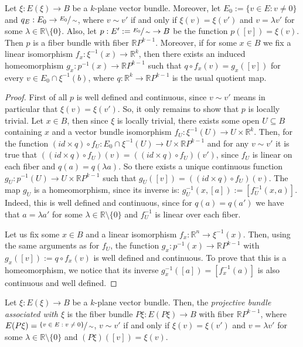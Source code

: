 \begin{proposition}\label{prop:proj_bundle} Let $\xi:E(\xi)\to B$ be a $k$-plane vector bundle. Moreover, let $E_0:=\{v\in E:v\neq 0\}$ and $q_E:E_0\to\sfrac{E_0}{\sim}$, where $v\sim v'$ if and only if $\xi(v)=\xi(v')$ and $v=\lambda v'$ for some $\lambda\in\mathbb{R}\setminus\{0\}$. Also, let $p:E':=\sfrac{E_0}{\sim}\to B$ be the function $p([v])=\xi(v)$. Then $p$ is a fiber bundle with fiber $\mathbb{R}P^{k-1}$. Moreover, if for some $x\in B$ we fix a linear isomorphism $f_x:\xi^{-1}(x)\to\mathbb{R}^k$, then there exists an induced homeomorphism $g_x:p^{-1}(x)\to\mathbb{R}P^{k-1}$ such that $q\circ f_x(v)=g_x([v])$ for every $v\in E_0\cap\xi^{-1}(b)$, where $q:\mathbb{R}^k\to\mathbb{R}P^{k-1}$ is the usual quotient map.
\end{proposition}
\begin{proof} First of all $p$ is well defined and continuous, since $v\sim v'$ means in particular that $\xi(v)=\xi(v')$. So, it only remains to show that $p$ is locally trivial. Let $x\in B$, then since $\xi$ is locally trivial, there exists some open $U\subseteq B$ containing $x$ and a vector bundle isomorphism $f_U:\xi^{-1}(U)\to U\times\mathbb{R}^k$. Then, for the function $(id\times q)\circ f_U:E_0\cap\xi^{-1}(U)\to U\times\mathbb{R}P^{k-1}$ and for any $v\sim v'$ it is true that $((id\times q)\circ f_U)(v)=((id\times q)\circ f_U)(v')$, since $f_U$ is linear on each fiber and $q(a)=q(\lambda a)$. So there exists a unique continuous function $g_U:p^{-1}(U)\to U\times\mathbb{R}P^{k-1}$ such that $g_U([v])=((id\times q)\circ f_U)(v)$. The map $g_U$ is a homeomorphism, since its inverse is: $g_U^{-1}(x,[a]):=[f_U^{-1}(x,a)]$. Indeed, this is well defined and continuous, since for $q(a)=q(a')$ we have that $a=\lambda a'$ for some $\lambda\in\mathbb{R}\setminus\{0\}$ and $f_U^{-1}$ is linear over each fiber.

Let us fix some $x\in B$ and a linear isomorphism $f_x:\mathbb{R}^n\to\xi^{-1}(x)$. Then, using the same arguments as for $f_U$, the function $g_x:p^{-1}(x)\to\mathbb{R}P^{k-1}$ with $g_x([v]):=q\circ f_x(v)$ is well defined and continuous. To prove that this is a homeomorphism, we notice that its inverse $g_x^{-1}([a])=[f_x^{-1}(a)]$ is also continuous and well defined.
\end{proof}

\begin{definition} Let $\xi:E(\xi)\to B$ be a $k$-plane vector bundle. Then, the \emph{projective bundle associated with $\xi$} is the fiber bundle $P\xi:E(P\xi)\to B$ with fiber $\mathbb{R}P^{k-1}$, where $E(P\xi)=\sfrac{\{v\in E:v\neq0\}}{\sim}$, $v\sim v'$ if and only if $\xi(v)=\xi(v')$ and $v=\lambda v'$ for some $\lambda\in\mathbb{R}\setminus\{0\}$ and $(P\xi)([v])=\xi(v)$.
\end{definition}

